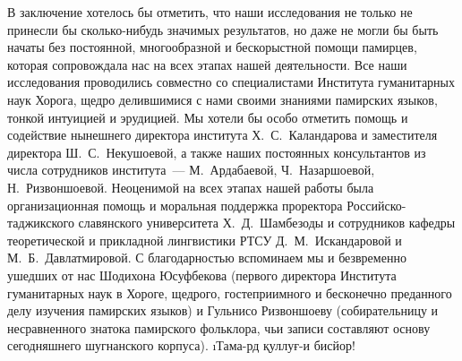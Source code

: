 В заключение хотелось бы отметить, что наши исследования не только не принесли бы сколько-нибудь значимых результатов, но даже не могли бы быть начаты без постоянной, многообразной и бескорыстной помощи памирцев, которая сопровождала нас на всех этапах нашей деятельности. Все наши исследования проводились совместно со специалистами Института гуманитарных наук Хорога, щедро делившимися с нами своими знаниями памирских языков, тонкой интуицией и эрудицией. Мы хотели бы особо отметить помощь и содействие нынешнего директора института Х.~С.~Каландарова и заместителя директора Ш.~С.~Некушоевой, а также наших постоянных консультантов из числа сотрудников института~— М.~Ардабаевой, Ч.~Назаршоевой, Н.~Ризвоншоевой. Неоценимой на всех этапах нашей работы была организационная помощь и моральная поддержка проректора Российско-таджикского славянского университета Х.~Д.~Шамбезоды и сотрудников кафедры теоретической и прикладной лингвистики РТСУ Д.~М.~Искандаровой и М.~Б.~Давлатмировой. С благодарностью вспоминаем мы и безвременно ушедших от нас Шодихона Юсуфбекова (первого директора Института гуманитарных наук в Хороге, щедрого, гостеприимного и бесконечно преданного делу изучения памирских языков) и Гульнисо Ризвоншоеву (собирательницу и несравненного знатока памирского фольклора, чьи записи составляют основу сегодняшнего шугнанского корпуса). \i{Тама-рд қуллуғ-и бисйор!}

